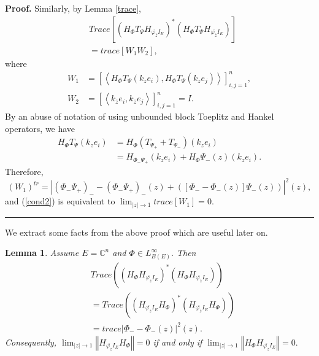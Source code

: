 \documentclass{article}%
\newtheorem{lemma}[theorem]{Lemma}
\newenvironment{proof}[1][Proof]{\noindent\textbf{#1.} }{\ \rule{0.5em}{0.5em}}
\begin{document}
\begin{proof}
Similarly, by Lemma \ref{trace},%
\begin{align*}
&  Trace\left[  \left(  H_{\Phi}T_{\Psi}H_{\overline{\varphi_{\overline{z}}%
}I_{E}}\right)  ^{\ast}\left(  H_{\Phi}T_{\Psi}H_{\overline{\varphi
_{\overline{z}}}I_{E}}\right)  \right] \\
&  =trace\left[  W_{1}W_{2}\right]  ,
\end{align*}
where%
\begin{align*}
W_{1}  &  =\left[  \left\langle H_{\Phi}T_{\Psi}\left(  k_{z}e_{i}\right)
,H_{\Phi}T_{\Psi}\left(  k_{z}e_{j}\right)  \right\rangle \right]
_{i,j=1}^{n} ,\\
W_{2}  &  =\left[  \left\langle k_{\overline{z}}e_{i},k_{\overline{z}}%
e_{j}\right\rangle \right]  _{i,j=1}^{n} =I.
\end{align*}
By an abuse of notation of using unbounded block Toeplitz and Hankel
operators, we have%
\begin{align*}
H_{\Phi}T_{\Psi}\left(  k_{z}e_{i}\right)   &  =H_{\Phi}\left(  T_{\Psi_{+}%
}+T_{\Psi_{-}}\right)  \left(  k_{z}e_{i}\right) \\
&  =H_{\Phi_{-}\Psi_{+}}\left(  k_{z}e_{i}\right)  +H_{\Phi}\Psi_{-}(z)\left(
k_{z}e_{i}\right)  .
\end{align*}
Therefore,%
\[
\left(  W_{1}\right)  ^{tr}=\left\vert \left(  \Phi_{-}\Psi_{+}\right)
_{-}-\left(  \Phi_{-}\Psi_{+}\right)  _{-}(z)+\left(  \left[  \Phi_{-}%
-\Phi_{-}(z)\right]  \Psi_{-}(z)\right)  \right\vert ^{2}(z),
\]
and (\ref{cond2}) is equivalent to $\lim_{\left\vert z\right\vert
\rightarrow1} trace \left[  W_{1}\right]  =0.$
\end{proof}

We extract some facts from the above proof which are useful later on.

\begin{lemma}
\label{lemma 3.9}Assume $E=\mathbb{C}^{n}$ and $\Phi\in L_{B(E)}^{\infty}.$
Then%
\begin{align*}
&  Trace(\left(  H_{\Phi}H_{\overline{\varphi_{\overline{z}}}I_{E}}\right)
^{\ast}\left(  H_{\Phi}H_{\overline{\varphi_{\overline{z}}}I_{E}}\right)  )\\
&  =Trace(\left(  H_{\overline{\varphi_{\overline{z}}}I_{E}}H_{\Phi}\right)
^{\ast}\left(  H_{\overline{\varphi_{\overline{z}}}I_{E}}H_{\Phi}\right)  )\\
&  =trace\left\vert \Phi_{-}-\Phi_{-}(z)\right\vert ^{2}(z).
\end{align*}
Consequently, $\lim_{\left\vert z\right\vert \rightarrow1}\left\Vert
H_{\overline{\varphi_{\overline{z}}}I_{E}}H_{\Phi}\right\Vert =0$ if and only
if $\lim_{\left\vert z\right\vert \rightarrow1}\left\Vert H_{\Phi}%
H_{\overline{\varphi_{\overline{z}}}I_{E}}\right\Vert =0.$
\end{lemma}
\end{document}
